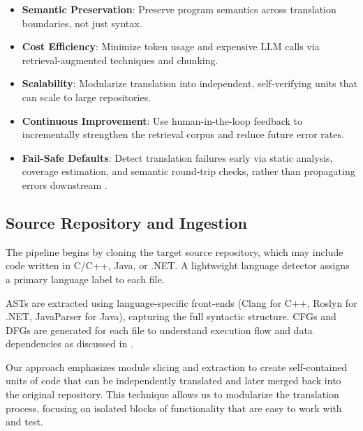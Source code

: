 \documentclass[twocolumn]{article}
\begin{document}
\begin{itemize}
    \item \textbf{Semantic Preservation}: Preserve program semantics across translation boundaries, not just syntax.
    \item \textbf{Cost Efficiency}: Minimize token usage and expensive LLM calls via retrieval-augmented techniques and chunking.
    \item \textbf{Scalability}: Modularize translation into independent, self-verifying units that can scale to large repositories.
    \item \textbf{Continuous Improvement}: Use human-in-the-loop feedback to incrementally strengthen the retrieval corpus and reduce future error rates.
    \item \textbf{Fail-Safe Defaults}: Detect translation failures early via static analysis, coverage estimation, and semantic round-trip checks, rather than propagating errors downstream \cite{ibrahimzada2024program}.
\end{itemize}

\subsection{Source Repository and Ingestion}

The pipeline begins by cloning the target source repository, which may include code written in C/C++, Java, or .NET. A lightweight language detector assigns a primary language label to each file.

ASTs are extracted using language-specific front-ends (Clang for C++, Roslyn for .NET, JavaParser for Java), capturing the full syntactic structure. CFGs and DFGs are generated for each file to understand execution flow and data dependencies as discussed in \cite{illinois-ir}.

\noindent Our approach emphasizes module slicing and extraction to create self-contained units of code that can be independently translated and later merged back into the original repository. This technique allows us to modularize the translation process, focusing on isolated blocks of functionality that are easy to work with and test.
\end{document}
